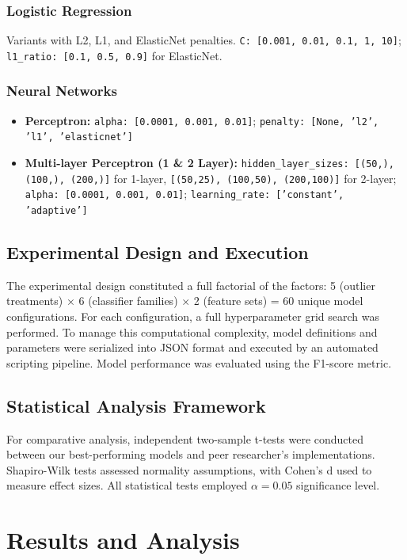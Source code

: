\documentclass[11pt]{article}
\begin{document}
\subsubsection{Logistic Regression}
Variants with L2, L1, and ElasticNet penalties. \texttt{C: [0.001, 0.01, 0.1, 1, 10]}; \texttt{l1\_ratio: [0.1, 0.5, 0.9]} for ElasticNet.

\subsubsection{Neural Networks}
\begin{itemize}[leftmargin=*,nosep]
    \item \textbf{Perceptron:} \texttt{alpha: [0.0001, 0.001, 0.01]}; \texttt{penalty: [None, 'l2', 'l1', 'elasticnet']}
    \item \textbf{Multi-layer Perceptron (1 \& 2 Layer):} \texttt{hidden\_layer\_sizes: [(50,), (100,), (200,)]} for 1-layer, \texttt{[(50,25), (100,50), (200,100)]} for 2-layer; \texttt{alpha: [0.0001, 0.001, 0.01]}; \texttt{learning\_rate: ['constant', 'adaptive']}
\end{itemize}

\subsection{Experimental Design and Execution}
The experimental design constituted a full factorial of the factors: 5 (outlier treatments) × 6 (classifier families) × 2 (feature sets) = 60 unique model configurations. For each configuration, a full hyperparameter grid search was performed. To manage this computational complexity, model definitions and parameters were serialized into JSON format and executed by an automated scripting pipeline. Model performance was evaluated using the F1-score metric.

\subsection{Statistical Analysis Framework}
For comparative analysis, independent two-sample t-tests were conducted between our best-performing models and peer researcher's implementations. Shapiro-Wilk tests assessed normality assumptions, with Cohen's d used to measure effect sizes. All statistical tests employed $\alpha = 0.05$ significance level.

\section{Results and Analysis}
\end{document}
